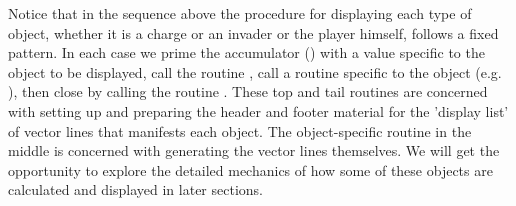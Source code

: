 Notice that in the sequence above the procedure for displaying each type of object, whether it is a charge or an invader or the player himself, follows a fixed pattern.
In each case we prime the accumulator () with a value specific to the object to be displayed, call the routine , call a routine
specific to the object (e.g. ), then close by calling the routine . These top and tail routines are concerned
with setting up and preparing the header and footer material for the  'display list' of vector lines that manifests each object. The object-specific routine
in the middle is concerned with generating the vector lines themselves. We will get the opportunity to explore the detailed mechanics of how
some of these objects are calculated and displayed in later sections.



